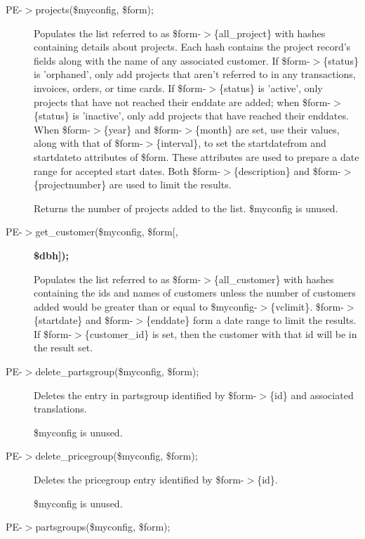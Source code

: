 \begin{description}
\begin{description}
\begin{description}
\begin{description}
\begin{description}
\begin{description}
\item[{PE-$>$projects(\$myconfig, \$form);}] \mbox{}

Populates the list referred to as \$form-$>$\{all\_project\} with hashes containing
details about projects.  Each hash contains the project record's fields along
with the name of any associated customer.  If \$form-$>$\{status\} is 'orphaned',
only add projects that aren't referred to in any transactions, invoices,
orders, or time cards.  If \$form-$>$\{status\} is 'active', only projects that have
not reached their enddate are added; when \$form-$>$\{status\} is 'inactive', only
add projects that have reached their enddates.  When \$form-$>$\{year\} and
\$form-$>$\{month\} are set, use their values, along with that of \$form-$>$\{interval\},
to set the startdatefrom and startdateto attributes of \$form.  These attributes
are used to prepare a date range for accepted start dates.  Both
\$form-$>$\{description\} and \$form-$>$\{projectnumber\} are used to limit the results.



Returns the number of projects added to the list.  \$myconfig is unused.


\item[{PE-$>$get\_customer(\$myconfig, \$form[,}] \textbf{\$dbh]);}

Populates the list referred to as \$form-$>$\{all\_customer\} with hashes containing
the ids and names of customers unless the number of customers added would be
greater than or equal to \$myconfig-$>$\{vclimit\}.  \$form-$>$\{startdate\} and
\$form-$>$\{enddate\} form a date range to limit the results.  If
\$form-$>$\{customer\_id\} is set, then the customer with that id will be in the
result set.


\item[{PE-$>$delete\_partsgroup(\$myconfig, \$form);}] \mbox{}

Deletes the entry in partsgroup identified by \$form-$>$\{id\} and associated
translations.



\$myconfig is unused.


\item[{PE-$>$delete\_pricegroup(\$myconfig, \$form);}] \mbox{}

Deletes the pricegroup entry identified by \$form-$>$\{id\}.



\$myconfig is unused.


\item[{PE-$>$partsgroups(\$myconfig, \$form);}] \mbox{}


\end{description}
\end{description}
\end{description}
\end{description}
\end{description}
\end{description}
